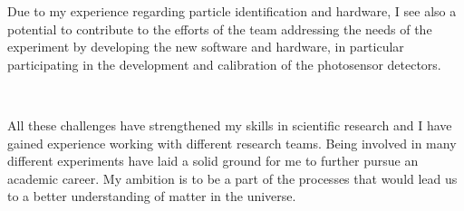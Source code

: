 \documentclass[a4paper]{article}
\begin{document}


Due to my experience regarding particle identification and hardware, I see also a potential to contribute to the efforts of the team addressing the needs of the experiment by developing the new software and hardware, in particular participating in the development and calibration of the photosensor detectors.

~\par All these challenges have strengthened my skills in scientific research and I have gained experience working with different research teams. Being involved in many different experiments have laid a solid ground for me to further pursue an academic career. My ambition is to be a part of the processes that would lead us to a better understanding of matter in the universe.
\end{document}
